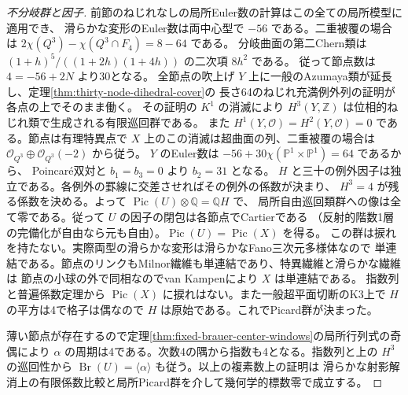 \begin{proof}[不分岐群と因子]
前節のねじれなしの局所Euler数の計算はこの全ての局所模型に適用でき、
滑らかな変形のEuler数は両中心型で $-56$ である。二重被覆の場合は
$2\chi(Q^3)-\chi(Q^3\cap F_4)=8-64$ である。
分岐曲面の第二Chern類は $(1+h)^5/((1+2h)(1+4h))$ の二次項 $8h^2$ である。
従って節点数は $4=-56+2N$ より30となる。
全節点の吹上げ $Y$ 上に一般のAzumaya類が延長し、定理\ref{thm:thirty-node-dihedral-cover}の
長さ64のねじれ充満例外列の証明が各点の上でそのまま働く。
その証明の $K^1$ の消滅により $H^3(Y,\mathbb Z)$ は位相的ねじれ類で生成される有限巡回群である。
また $H^1(Y,\mathcal O)=H^2(Y,\mathcal O)=0$ である。節点は有理特異点で
$X$ 上のこの消滅は超曲面の列、二重被覆の場合は
$\mathcal O_{Q^3}\oplus\mathcal O_{Q^3}(-2)$ から従う。
$Y$ のEuler数は $-56+30\chi(\mathbb P^1\times\mathbb P^1)=64$ であるから、
Poincar\'e双対と $b_1=b_3=0$ より $b_2=31$ となる。
$H$ と三十の例外因子は独立である。各例外の罫線に交差させればその例外の係数が決まり、
$H^3=4$ が残る係数を決める。よって $\operatorname{Pic}(U)\otimes\mathbb Q=\mathbb Q H$ で、
局所自由巡回類群への像は全て零である。従って $U$ の因子の閉包は各節点でCartierである
（反射的階数1層の完備化が自由なら元も自由）。$\operatorname{Pic}(U)=\operatorname{Pic}(X)$ を得る。
この群は捩れを持たない。実際両型の滑らかな変形は滑らかなFano三次元多様体なので
単連結である。節点のリンクもMilnor繊維も単連結であり、特異繊維と滑らかな繊維は
節点の小球の外で同相なのでvan Kampenにより $X$ は単連結である。
指数列と普遍係数定理から $\operatorname{Pic}(X)$ に捩れはない。また一般超平面切断のK3上で
$H$ の平方は4で格子は偶なので $H$ は原始である。これでPicard群が決まった。

薄い節点が存在するので定理\ref{thm:fixed-brauer-center-windows}の局所行列式の奇偶により
$\alpha$ の周期は4である。次数4の隅から指数も4となる。指数列と上の $H^3$ の巡回性から
$\operatorname{Br}(U)=\langle\alpha\rangle$ も従う。以上の複素数上の証明は
滑らかな射影解消上の有限係数比較と局所Picard群を介して幾何学的標数零で成立する。
\end{proof}

